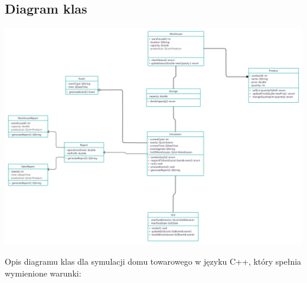 \documentclass[11pt]{article}
\begin{document}
\subsection{Diagram klas}

\includegraphics[scale=0.15]{Diagram klas.png}

Opis diagramu klas dla symulacji domu towarowego w języku C++, który spełnia wymienione warunki:
\end{document}
